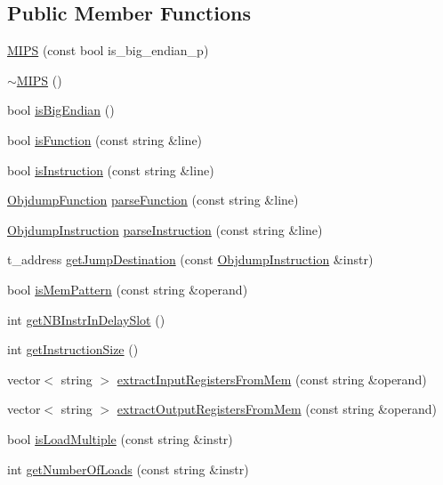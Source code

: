 \subsection*{Public Member Functions}
\begin{DoxyCompactItemize}
\item 
\hyperlink{classMIPS_a758824a40d11a4d0003e781d0e8ea51c}{M\+I\+PS} (const bool is\+\_\+big\+\_\+endian\+\_\+p)
\item 
\hyperlink{classMIPS_a71b83e8e05e3a5d454faa9fe02a75fe7}{$\sim$\+M\+I\+PS} ()
\item 
bool \hyperlink{classMIPS_ae645fa32988ae74ef68ee141ee88a434}{is\+Big\+Endian} ()
\item 
bool \hyperlink{classMIPS_a2de73769c68612b81e2e15b4eaf07969}{is\+Function} (const string \&line)
\item 
bool \hyperlink{classMIPS_a86a3224889b2d3e2486072b7bc5c26f3}{is\+Instruction} (const string \&line)
\item 
\hyperlink{classObjdumpFunction}{Objdump\+Function} \hyperlink{classMIPS_a03874bd0a2a980e174ea447482a830c3}{parse\+Function} (const string \&line)
\item 
\hyperlink{classObjdumpInstruction}{Objdump\+Instruction} \hyperlink{classMIPS_a8a3bbe0cf81cf032f3e8e1d1786c888f}{parse\+Instruction} (const string \&line)
\item 
t\+\_\+address \hyperlink{classMIPS_a64b2312c1817faef2ca139497ffa7ec9}{get\+Jump\+Destination} (const \hyperlink{classObjdumpInstruction}{Objdump\+Instruction} \&instr)
\item 
bool \hyperlink{classMIPS_a73e4206a1a7c2ee6461520c52fa5dcde}{is\+Mem\+Pattern} (const string \&operand)
\item 
int \hyperlink{classMIPS_a15519e774487809038024a6cc0febab3}{get\+N\+B\+Instr\+In\+Delay\+Slot} ()
\item 
int \hyperlink{classMIPS_ad192996344511aa0152adf644cf84238}{get\+Instruction\+Size} ()
\item 
vector$<$ string $>$ \hyperlink{classMIPS_acf8659c9a36074bbe47455275a4829f7}{extract\+Input\+Registers\+From\+Mem} (const string \&operand)
\item 
vector$<$ string $>$ \hyperlink{classMIPS_af03518e68285f24da7a0b2e16020d8d2}{extract\+Output\+Registers\+From\+Mem} (const string \&operand)
\item 
bool \hyperlink{classMIPS_aeb0b38a8be26d938889beb59ee1a98fb}{is\+Load\+Multiple} (const string \&instr)
\item 
int \hyperlink{classMIPS_ad2447a7ac47005463a13e4e78dd55594}{get\+Number\+Of\+Loads} (const string \&instr)

\end{DoxyCompactItemize}
